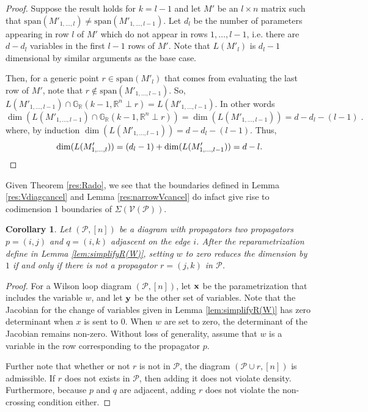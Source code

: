 \documentclass[11pt]{article}
\newcommand{\R}{\mathbb{R}}
\newcommand{\Grall}{\mathbb{G}_{\R}}
\newcommand{\cP}{\mathcal{P}}
\newcommand{\cV}{\mathcal{V}}
\newcommand{\VP}{\cV(\cP)}
\newtheorem{cor}[thm]{Corollary}
\theoremstyle{remark}
\theoremstyle{definition}
\begin{document}
\begin{appendices}
\begin{proof}
Suppose the result holds for $k = l-1$ and let $M'$ be an $l \times n$ matrix such that $\mathrm{span}(M'_{1,\dots,l}) \neq \mathrm{span}(M'_{1,\dots,l-1})$. Let $d_l$ be the number of parameters appearing in row $l$ of $M'$ which do not appear in rows $1, \dots, l-1$, i.e. there are $d - d_l$ variables in the first $l-1$ rows of $M'$. Note that $L(M'_l)$ is $d_l -1$ dimensional by similar arguments as the base case.

Then, for a generic point $r \in \mathrm{span}(M'_{l})$ that comes from evaluating the last row of $M'$, note that $r \notin \mathrm{span}(M'_{1,\dots,l-1})$. So, $L(M'_{1,\dots,l-1})\cap \Grall(k-1, \mathbb{R}^n \perp r) = L(M'_{1,\dots,l-1})$. In other words
%
\begin{displaymath}
\dim(L(M'_{1,\dots,l-1}) \cap \Grall(k-1, \mathbb{R}^n \perp r)) = \dim(L(M'_{1,\dots,l-1})) = d - d_l -(l-1)\;.
\end{displaymath}
%
\noindent
where, by induction $\dim(L(M'_{1,\dots,l-1})) = d - d_l -(l-1)$. Thus,
%
\begin{displaymath}
\dim(L(M'_{1,\dots,l})) = (d_l - 1) + \dim(L(M'_{1,\dots,l-1})) = d-l.
\qedhere
\end{displaymath}
\end{proof}

Given Theorem \ref{res:Rado}, we see that the boundaries defined in Lemma \ref{res:Vdiagcancel} and Lemma \ref{res:narrowVcancel} do infact give rise to codimension 1 boundaries of $\Sigma(\VP)$.

\begin{cor} \label{res:reparamdim}
Let $(\cP, [n])$ be a diagram with propagators two propagators $p = (i, j)$ and $q = (i, k)$ adjascent on the edge $i$. After the reparametrization define in Lemma \ref{lem:simplifyR(W)}, setting $w$ to zero reduces the dimension by $1$ if and only if there is not a propagator $r = (j, k)$ in $\cP$.
\end{cor}
\begin{proof}
For a Wilson loop diagram $(\cP, [n])$, let $\bf{x}$ be the parametrization that includes the variable $w$, and let $\bf{y}$ be the other set of variables. Note that the Jacobian for the change of variables given in Lemma \ref{lem:simplifyR(W)} has zero determinant when $x$ is sent to $0$. When $w$ are set to zero, the determinant of the Jacobian remains non-zero. Without loss of generality, assume that $w$ is a variable in the row corresponding to the propagator $p$.

Further note that whether or not $r$ is not in $\cP$, the diagram $(\cP \cup r, [n])$ is admissible. If $r$ does not exists in $\cP$, then adding it does not violate density. Furthermore, because $p$ and $q$ are adjacent, adding $r$ does not violate the non-crossing condition either. 


\end{proof}
\end{appendices}
\end{document}
